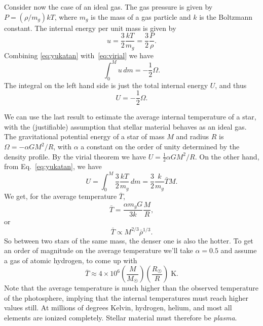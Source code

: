 \documentclass[10pt,amsmath,amssymb,aps,pra]{revtex4-2}
\newcommand{\unit}[1]{\;\mathrm{#1}}
\newcommand{\Sun}{\astrosun}
\begin{document}
Consider now the case of an ideal gas. The gas pressure is given by
$P = (\rho/m_g)kT$, where $m_g$ is the mass of a gas particle and $k$ is the
Boltzmann constant. The internal energy per unit mass is given by
\begin{equation}\label{eq:yukatan}
u = \frac{3}{2}\frac{kT}{m_g} = \frac{3}{2}\frac{P}{\rho}.
\end{equation}
Combining \eqref{eq:yukatan} with~\eqref{eq:virial} we have
\begin{equation}
\int_0^Mu\,dm = -\frac{1}{2}\Omega.
\end{equation}
The integral on the left hand side is just the total internal energy $U$, and
thus
\begin{equation}
U = -\frac{1}{2}\Omega.
\end{equation}

We can use the last result to estimate the average internal temperature of a
star, with the (justifiable) assumption that stellar material behaves as an
ideal gas. The gravitational potential energy of a star of mass $M$ and radius
$R$ is $\Omega = -\alpha{G}M^2/R$, with $\alpha$ a constant on the order of
unity determined by the density profile. By the virial theorem we have
$U = \frac{1}{2}\alpha{G}M^2/R$. On the other hand, from Eq.~\eqref{eq:yukatan},
we have
\begin{equation}
U = \int_0^M\frac{3}{2}\frac{kT}{m_g}\,dm=\frac{3}{2}\frac{k}{m_g}\bar{T}M.
\end{equation}
We get, for the average temperature $\bar{T}$,
\begin{equation}\label{eq:tibar}
\bar{T} = \frac{\alpha{m}_gG}{3k}\frac{M}{R},
\end{equation}
or
\begin{equation}
\bar{T}\propto{M}^{2/3}\bar{\rho}^{1/3}.
\end{equation}
So between two stars of the same mass, the denser one is also the hotter. To get
an order of magnitude on the average temperature we'll take $\alpha=0.5$ and
assume a gas of atomic hydrogen, to come up with
\begin{equation}
\bar{T} \approx 4\times10^6\left(\frac{M}{M_{\Sun}}\right)\left(\frac{R_{\Sun}}
{R}\right)\unit{K}.
\end{equation}
Note that the average temperature is much higher than the observed temperature
of the photosphere, implying that the internal temperatures must reach higher
values still. At millions of degrees Kelvin, hydrogen, helium, and most all
elements are ionized completely. Stellar material must therefore be
\emph{plasma}.
\end{document}
